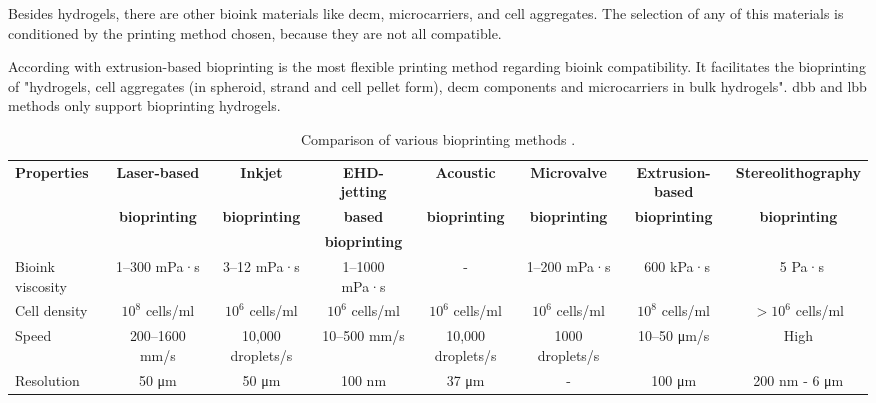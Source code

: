 Besides hydrogels, there are other bioink materials like \gls{decm}, microcarriers, and cell aggregates. The selection of any of this materials is conditioned by the printing method chosen, because they are not all compatible.

According with \citeauthor{Hospodiuk2017_bioink_comprehensive_review_bioprintable_materials}\cite{Hospodiuk2017_bioink_comprehensive_review_bioprintable_materials} extrusion-based bioprinting is the most flexible printing method regarding bioink compatibility. It facilitates the bioprinting of "hydrogels, cell aggregates (in spheroid, strand and cell pellet form), \gls{decm} components and microcarriers in bulk hydrogels". \gls{dbb} and \gls{lbb} methods only support bioprinting hydrogels.

\begin{table}[ht]
	\caption{Comparison of various bioprinting methods \cite{Vijayavenkataraman2018_bioprinting_tissues_organs_regen_med}.}
	\label{tab:system_architecture_requirements_bioprinting_methods_comparison}
\centering
\begin{adjustbox}{width=1.2\textwidth,center=\textwidth}
\begin{tabular}{lccccccc}
	\toprule
	\textbf{Properties} & \textbf{Laser-based} & \textbf{Inkjet} & \textbf{EHD-jetting} & \textbf{Acoustic} & \textbf{Microvalve} & \textbf{Extrusion-based} & \textbf{Stereolithography}\\
    & \textbf{bioprinting} & \textbf{bioprinting} & \textbf{based} & \textbf{bioprinting} & \textbf{bioprinting} & \textbf{bioprinting} & \textbf{bioprinting}\\
    & & & \textbf{bioprinting} & & & &\\
	\midrule

Bioink viscosity & 1–300 mPa·s & 3–12 mPa·s & 1–1000 mPa·s & - & 1–200 mPa·s & ~600 kPa·s & ~5 Pa·s \\

Cell density & $10^8$ cells/ml & $10^6$ cells/ml & $10^6$ cells/ml & $10^6$ cells/ml & $10^6$ cells/ml & $10^8$ cells/ml & $>10^6$ cells/ml\\

Speed & 200–1600 mm/s & 10,000 droplets/s & 10–500 mm/s & 10,000 droplets/s & 1000 droplets/s & 10–50 \si{\micro\meter}/s & High\\

Resolution & 50 \si{\micro\meter} & 50 \si{\micro\meter} & 100 nm & 37 \si{\micro\meter} & - & 100 \si{\micro\meter} & 200 nm - 6 \si{\micro\meter}\\


\end{tabular}
\end{adjustbox}
\end{table}

